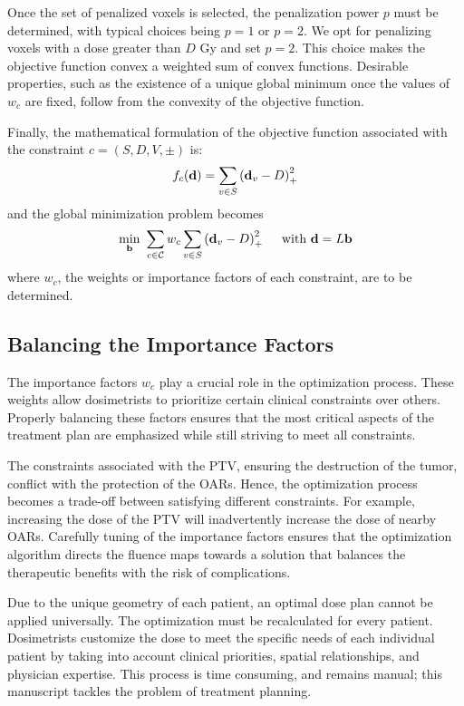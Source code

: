 Once the set of penalized voxels is selected, the penalization power $p$ must be determined, with typical choices being $p=1$ or $p=2$.
We opt for penalizing voxels with a dose greater than $D$ Gy and set $p=2$.
This choice makes the objective function convex a weighted sum of convex functions.
Desirable properties, such as the existence of a unique global minimum once the values of $w_c$ are fixed, follow from the convexity of the objective function.

Finally, the mathematical formulation of the objective function associated with the constraint $c = \left( S, D, V, \pm \right)$ is:
$$f_c(\mathbf{d}) = \sum_{v \in S} \left( {\mathbf{d}_v - D} \right)_+^2$$
and the global minimization problem becomes
$$
\min_{\mathbf{b}} \ \sum_{c \in \mathcal{C}} w_c \sum_{v \in S} \left( {\mathbf{d}_v - D} \right)_+^2
\quad \text{ with }
\mathbf{d} = L\mathbf{b}
$$
where $w_c$, the weights or importance factors of each constraint, are to be determined.

\subsection{Balancing the Importance Factors}
The importance factors $w_c$ play a crucial role in the optimization process.
These weights allow dosimetrists to prioritize certain clinical constraints over others.
Properly balancing these factors ensures that the most critical aspects of the treatment plan are emphasized while still striving to meet all constraints.

The constraints associated with the PTV, ensuring the destruction of the tumor, conflict with the protection of the OARs.
Hence, the optimization process becomes a trade-off between satisfying different constraints.
For example, increasing the dose of the PTV will inadvertently increase the dose of nearby OARs.
Carefully tuning of the importance factors ensures that the optimization algorithm directs the fluence maps towards a solution that balances the therapeutic benefits with the risk of complications.

Due to the unique geometry of each patient, an optimal dose plan cannot be applied universally.
The optimization must be recalculated for every patient.
Dosimetrists customize the dose to meet the specific needs of each individual patient by taking into account clinical priorities, spatial relationships, and physician expertise.
This process is time consuming, and remains manual; this manuscript tackles the problem of treatment planning.

